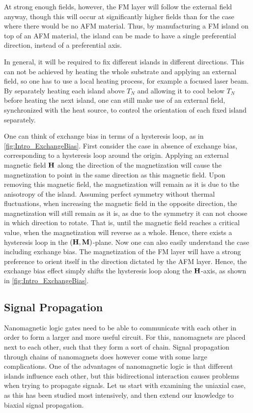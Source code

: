 \documentclass[11pt,a4paper,english]{article}
\begin{document}
At strong enough fields, however, the FM layer will follow the external field anyway, though this will occur at significantly higher fields than for the case where there would be no AFM material. Thus, by manufacturing a FM island on top of an AFM material, the island can be made to have a single preferential direction, instead of a preferential axis. \par
In general, it will be required to fix different islands in different directions. This can not be achieved by heating the whole substrate and applying an external field, so one has to use a local heating process, for example a focused laser beam. By separately heating each island above $T_N$ and allowing it to cool below $T_N$ before heating the next island, one can still make use of an external field, synchronized with the heat source, to control the orientation of each fixed island separately. \par
One can think of exchange bias in terms of a hysteresis loop, as in \cref{fig:Intro_ExchangeBias}. First consider the case in absence of exchange bias, corresponding to a hysteresis loop around the origin. Applying an external magnetic field $\vb{H}$ along the direction of the magnetization will cause the magnetization to point in the same direction as this magnetic field. Upon removing this magnetic field, the magnetization will remain as it is due to the anisotropy of the island. Assuming perfect symmetry without thermal fluctuations, when increasing the magnetic field in the opposite direction, the magnetization will still remain as it is, as due to the symmetry it can not choose in which direction to rotate. That is, until the magnetic field reaches a critical value, when the magnetization will reverse as a whole. Hence, there exists a hysteresis loop in the $(\vb{H}, \vb{M})$-plane. Now one can also easily understand the case including exchange bias. The magnetization of the FM layer will have a strong preference to orient itself in the direction dictated by the AFM layer. Hence, the exchange bias effect simply shifts the hysteresis loop along the $\vb{H}$-axis, as shown in \cref{fig:Intro_ExchangeBias}.

\subsection{Signal Propagation}
Nanomagnetic logic gates need to be able to communicate with each other in order to form a larger and more useful circuit. For this, nanomagnets are placed next to each other, such that they form a sort of chain. Signal propagation through chains of nanomagnets does however come with some large complications. One of the advantages of nanomagnetic logic is that different islands influence each other, but this bidirectional interaction causes problems when trying to propagate signals. Let us start with examining the uniaxial case, as this has been studied most intensively, and then extend our knowledge to biaxial signal propagation.
\end{document}
